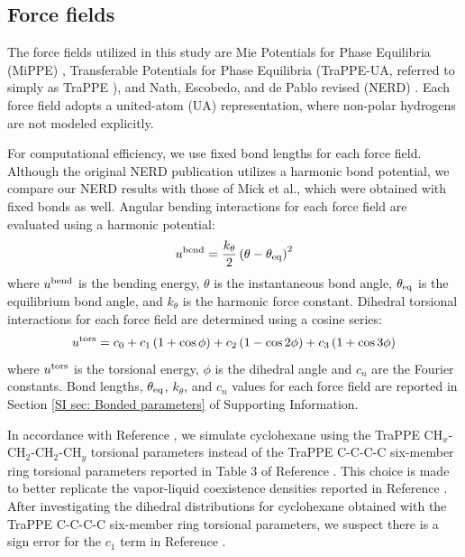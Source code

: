 \documentclass[journal=jced,manuscript=article]{achemso}
\begin{document}
\subsection{Force fields} \label{sec: Force fields}

    The force fields utilized in this study are Mie Potentials for Phase Equilibria (MiPPE) \cite{Mie,Potoff_branched,Barhaghi2017}, Transferable Potentials for Phase Equilibria (TraPPE-UA, referred to simply as TraPPE \cite{TraPPE,Martin1999,Keasler2012}), and Nath, Escobedo, and de Pablo revised (NERD) \cite{NERD,Nath2001}. Each force field adopts a united-atom (UA) representation, where non-polar hydrogens are not modeled explicitly. 
    
    
    For computational efficiency, we use fixed bond lengths for each force field. Although the original NERD publication\cite{NERD} utilizes a harmonic bond potential, we compare our NERD results with those of Mick et al.\cite{Potoff_branched}, which were obtained with fixed bonds as well. Angular bending interactions for each force field are evaluated using a harmonic potential:
    \begin{equation}
    u^{\rm bend} = \frac{k_\theta}{2} \left(\theta-\theta_{\rm eq}\right)^2
    \end{equation}
    where $u^{\rm bend}$ is the bending energy, $\theta$ is the instantaneous bond angle, $\theta_{\rm eq}$ is the equilibrium bond angle, and $k_\theta$ is the harmonic force constant. Dihedral torsional interactions for each force field are determined using a cosine series:
    \begin{equation}
    u^{\rm tors} = c_0 + c_1 \left(1+\cos{\phi}\right) + c_2 \left(1-\cos{2\phi}\right) + c_3 \left(1+\cos{3\phi}\right)
    \end{equation}
    where $u^{\rm tors}$ is the torsional energy, $\phi$ is the dihedral angle and $c_n$ are the Fourier constants. Bond lengths, $\theta_{\rm eq}$, $k_\theta$, and $c_n$ values for each force field are reported in Section \ref{SI sec: Bonded parameters} of Supporting Information.
    
    In accordance with Reference , we simulate cyclohexane using the TraPPE CH$_x$-CH$_2$-CH$_2$-CH$_y$ torsional parameters instead of the TraPPE C-C-C-C six-member ring torsional parameters reported in Table 3 of Reference . This choice is made to better replicate the vapor-liquid coexistence densities reported in Reference . After investigating the dihedral distributions for cyclohexane obtained with the TraPPE C-C-C-C six-member ring torsional parameters, we suspect there is a sign error for the $c_1$ term in Reference .
    
\end{document}
